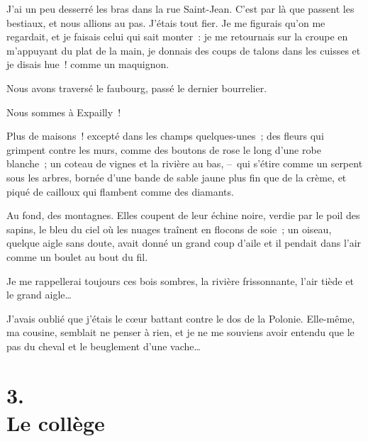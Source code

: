 \documentclass[french,twoside]{book} %
\begin{document}
J’ai un peu desserré les bras dans la rue Saint-Jean. C’est par là que passent les bestiaux, et nous allions au pas. J’étais tout fier. Je me figurais qu’on me regardait, et je faisais celui qui sait monter : je me retournais sur la croupe en m’appuyant du plat de la main, je donnais des coups de talons dans les cuisses et je disais hue ! comme un maquignon.\par
Nous avons traversé le faubourg, passé le dernier bourrelier.\par
Nous sommes à Expailly !\par
Plus de maisons ! excepté dans les champs quelques-unes ; des fleurs qui grimpent contre les murs, comme des boutons de rose le long d’une robe blanche ; un coteau de vignes et la rivière au bas, – qui s’étire comme un serpent sous les arbres, bornée d’une bande de sable jaune plus fin que de la crème, et piqué de cailloux qui flambent comme des diamants.\par
Au fond, des montagnes. Elles coupent de leur échine noire, verdie par le poil des sapins, le bleu du ciel où les nuages traînent en flocons de soie ; un oiseau, quelque aigle sans doute, avait donné un grand coup d’aile et il pendait dans l’air comme un boulet au bout du fil.\par
Je me rappellerai toujours ces bois sombres, la rivière frissonnante, l’air tiède et le grand aigle…\par
J’avais oublié que j’étais le cœur battant contre le dos de la Polonie. Elle-même, ma cousine, semblait ne penser à rien, et je ne me souviens avoir entendu que le pas du cheval et le beuglement d’une vache…
\section[{3. Le collège}]{3. \\
Le collège}\renewcommand{\leftmark}{3. \\
Le collège}
\end{document}
